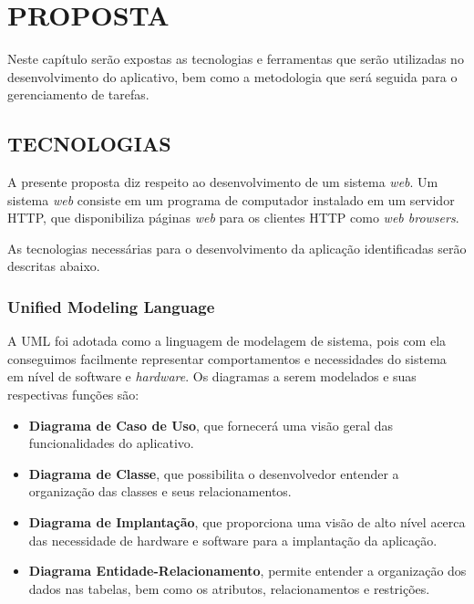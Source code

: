 
\chapter{PROPOSTA}
\label{chap:proposta}

Neste capítulo serão expostas as tecnologias e ferramentas que serão utilizadas no desenvolvimento do aplicativo, bem como a metodologia que será seguida para o gerenciamento de tarefas.

\section{TECNOLOGIAS}
\label{sec:tecnologias}

A presente proposta diz respeito ao desenvolvimento de um sistema \textit{web}. Um sistema \textit{web} consiste em um programa de computador instalado em um servidor HTTP, que disponibiliza páginas \textit{web} para os clientes HTTP como \textit{web browsers}.

As tecnologias necessárias para o desenvolvimento da aplicação identificadas serão descritas abaixo.

\subsection{Unified Modeling Language}
\label{sub:uml}

A UML foi adotada como a linguagem de modelagem de sistema, pois com ela conseguimos facilmente representar comportamentos e necessidades do sistema em nível de software e \textit{hardware}. Os diagramas a serem modelados e suas respectivas funções são:

\begin{itemize}
    \item \textbf{Diagrama de Caso de Uso}, que fornecerá uma visão geral das funcionalidades do aplicativo.
    
    \item \textbf{Diagrama de Classe}, que possibilita o desenvolvedor entender a organização das classes e seus relacionamentos.
    
    \item \textbf{Diagrama de Implantação}, que proporciona uma visão de alto nível acerca das necessidade de hardware e software para a implantação da aplicação.
    
    \item \textbf{Diagrama Entidade-Relacionamento}, permite entender a organização dos dados nas tabelas, bem como os atributos, relacionamentos e restrições.
\end{itemize}

